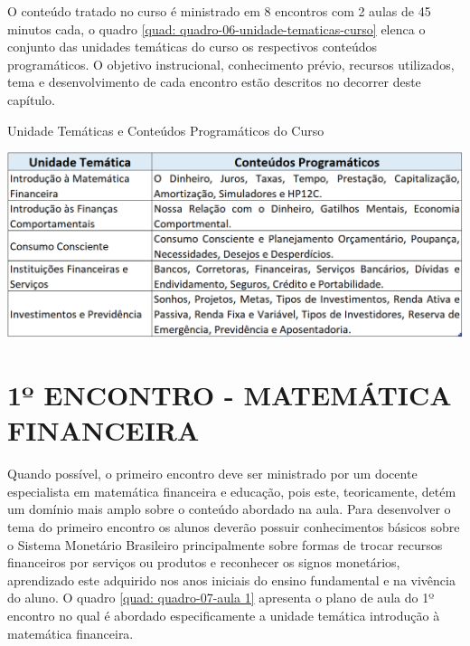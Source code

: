 O conteúdo tratado no curso é ministrado em 8 encontros com 2 aulas de 45 minutos cada, o quadro \ref{quad: quadro-06-unidade-tematicas-curso} elenca o conjunto das unidades temáticas do curso os respectivos conteúdos programáticos. O objetivo instrucional, conhecimento prévio, recursos utilizados, tema e desenvolvimento de cada encontro estão descritos no decorrer deste capítulo.

\graphicspath{{quadros/}} 
\begin{quadro}[!ht]
\centering
\begin{minipage}{0.9\textwidth}
\caption{Unidade Temáticas e Conteúdos Programáticos do Curso}
\centering
\includegraphics[width=1.0\textwidth]{quadro-06-unidade-tematicas-curso}
\label{quad: quadro-06-unidade-tematicas-curso}
\end{minipage}
\end{quadro}

\section{1º ENCONTRO - MATEMÁTICA FINANCEIRA}
Quando possível, o primeiro encontro deve ser ministrado por um docente especialista em matemática financeira e educação, pois este, teoricamente, detém um domínio mais amplo sobre o conteúdo abordado na aula. Para desenvolver o tema do primeiro encontro os alunos deverão possuir conhecimentos básicos sobre o Sistema Monetário Brasileiro principalmente sobre formas de trocar recursos financeiros por serviços ou produtos e reconhecer os signos monetários, aprendizado este adquirido nos anos iniciais do ensino fundamental e na vivência do aluno. O quadro \ref{quad: quadro-07-aula 1} apresenta o plano de aula do 1º encontro no qual é abordado especificamente a unidade temática introdução à matemática financeira.

